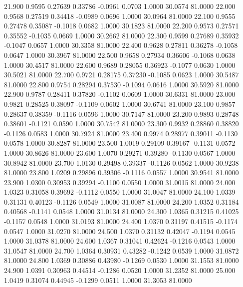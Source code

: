   21.900   0.9595   0.27639   0.33786  -0.0961   0.0703   1.0000  30.0574  81.0000
  22.000   0.9568   0.27519   0.34418  -0.0989   0.0696   1.0000  30.0964  81.0000
  22.100   0.9555   0.27478   0.35087  -0.1018   0.0682   1.0000  30.1823  81.0000
  22.200   0.9573   0.27571   0.35552  -0.1035   0.0669   1.0000  30.2662  81.0000
  22.300   0.9599   0.27689   0.35932  -0.1047   0.0657   1.0000  30.3358  81.0000
  22.400   0.9628   0.27811   0.36278  -0.1058   0.0647   1.0000  30.3967  81.0000
  22.500   0.9658   0.27934   0.36606  -0.1068   0.0638   1.0000  30.4517  81.0000
  22.600   0.9689   0.28055   0.36923  -0.1077   0.0630   1.0000  30.5021  81.0000
  22.700   0.9721   0.28175   0.37230  -0.1085   0.0623   1.0000  30.5487  81.0000
  22.800   0.9754   0.28294   0.37530  -0.1094   0.0616   1.0000  30.5920  81.0000
  22.900   0.9787   0.28411   0.37820  -0.1102   0.0609   1.0000  30.6331  81.0000
  23.000   0.9821   0.28525   0.38097  -0.1109   0.0602   1.0000  30.6741  81.0000
  23.100   0.9857   0.28637   0.38359  -0.1116   0.0596   1.0000  30.7147  81.0000
  23.200   0.9893   0.28748   0.38601  -0.1121   0.0590   1.0000  30.7542  81.0000
  23.300   0.9932   0.28860   0.38820  -0.1126   0.0583   1.0000  30.7924  81.0000
  23.400   0.9974   0.28977   0.39011  -0.1130   0.0578   1.0000  30.8287  81.0000
  23.500   1.0019   0.29109   0.39167  -0.1131   0.0572   1.0000  30.8626  81.0000
  23.600   1.0070   0.29271   0.39280  -0.1130   0.0567   1.0000  30.8942  81.0000
  23.700   1.0130   0.29498   0.39337  -0.1126   0.0562   1.0000  30.9238  81.0000
  23.800   1.0209   0.29896   0.39306  -0.1116   0.0557   1.0000  30.9541  81.0000
  23.900   1.0300   0.30953   0.39294  -0.1100   0.0550   1.0000  31.0015  81.0000
  24.000   1.0323   0.31058   0.39692  -0.1112   0.0550   1.0000  31.0047  81.0000
  24.100   1.0339   0.31131   0.40123  -0.1126   0.0549   1.0000  31.0087  81.0000
  24.200   1.0352   0.31184   0.40568  -0.1141   0.0548   1.0000  31.0134  81.0000
  24.300   1.0365   0.31215   0.41025  -0.1157   0.0548   1.0000  31.0193  81.0000
  24.400   1.0370   0.31197   0.41515  -0.1174   0.0547   1.0000  31.0270  81.0000
  24.500   1.0370   0.31132   0.42047  -0.1194   0.0545   1.0000  31.0378  81.0000
  24.600   1.0367   0.31041   0.42624  -0.1216   0.0543   1.0000  31.0547  81.0000
  24.700   1.0364   0.30931   0.43282  -0.1242   0.0539   1.0000  31.0872  81.0000
  24.800   1.0369   0.30886   0.43980  -0.1269   0.0530   1.0000  31.1553  81.0000
  24.900   1.0391   0.30963   0.44514  -0.1286   0.0520   1.0000  31.2352  81.0000
  25.000   1.0419   0.31074   0.44945  -0.1299   0.0511   1.0000  31.3053  81.0000
